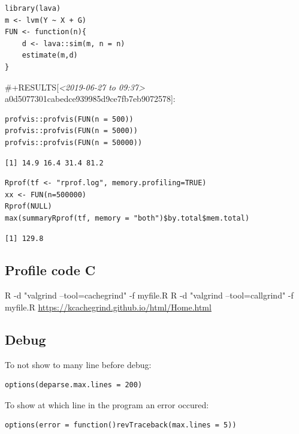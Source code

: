 \documentclass{article}
\begin{document}
\lstset{language=r,label= ,caption= ,captionpos=b,numbers=none}
\begin{lstlisting}
library(lava)
m <- lvm(Y ~ X + G)
FUN <- function(n){
    d <- lava::sim(m, n = n)
    estimate(m,d)
}
\end{lstlisting}

\#+RESULTS[\textit{<2019-06-27 to 09:37> } a0d5077301cabedce939985d9ce7fb7eb9072578]:

\lstset{language=r,label= ,caption= ,captionpos=b,numbers=none}
\begin{lstlisting}
profvis::profvis(FUN(n = 500))
profvis::profvis(FUN(n = 5000))
profvis::profvis(FUN(n = 50000))
\end{lstlisting}

\begin{verbatim}
[1] 14.9 16.4 31.4 81.2
\end{verbatim}


\lstset{language=r,label= ,caption= ,captionpos=b,numbers=none}
\begin{lstlisting}
Rprof(tf <- "rprof.log", memory.profiling=TRUE)
xx <- FUN(n=500000)
Rprof(NULL)
max(summaryRprof(tf, memory = "both")$by.total$mem.total)

\end{lstlisting}

\begin{verbatim}
[1] 129.8
\end{verbatim}

\subsection{Profile code C}
\label{sec:org6bfbe11}
R -d "valgrind --tool=cachegrind" -f myfile.R
R -d "valgrind --tool=callgrind" -f myfile.R
\url{https://kcachegrind.github.io/html/Home.html}

\subsection{Debug}
\label{sec:org42fa067}
To not show to many line before debug:
\lstset{language=r,label= ,caption= ,captionpos=b,numbers=none}
\begin{lstlisting}
options(deparse.max.lines = 200)
\end{lstlisting}

To show at which line in the program an error occured:
\lstset{language=r,label= ,caption= ,captionpos=b,numbers=none}
\begin{lstlisting}
options(error = function()revTraceback(max.lines = 5))
\end{lstlisting}
\end{document}
